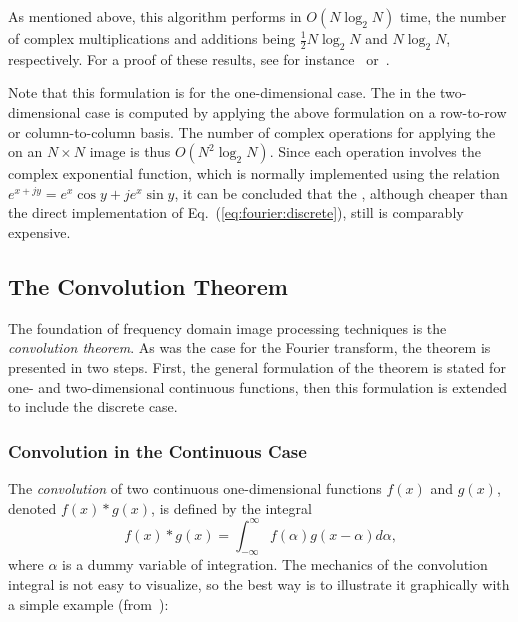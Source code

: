 As mentioned above, this algorithm performs in $O(N\log_{2}N)$ time,
the number of complex multiplications and additions being
$\frac{1}{2}N\log_{2}N$ and $N\log_{2}N$, respectively.  For a proof
of these results, see for instance~\cite{brigham} or~\cite{digim}.  

Note that this formulation is for the one-dimensional case.  The
{\fft} in the two-dimensional case is computed by applying the above
formulation on a row-to-row or column-to-column basis.
\label{pg:fft:O} The number of complex operations for applying the
{\fft} on an $N\times N$ image is thus $O(N^{2}\log_{2}N)$.  Since
each operation involves the complex exponential function, which is
normally implemented using the relation $e^{x+jy}=e^{x}\cos
y+je^{x}\sin y$, it can be concluded that the {\fft}, although
cheaper than the direct implementation of
Eq.~(\ref{eq:fourier:discrete}), still is comparably expensive.


\subsection{The Convolution Theorem}
\label{image:frequency:convolution}

The foundation of frequency domain image processing techniques is the
{\em convolution theorem\/}.  As was the case for the Fourier
transform, the theorem is presented in two steps.  First, the general
formulation of the theorem is stated for one- and two-dimensional
continuous functions, then this formulation is extended to include the
discrete case.

\subsubsection{Convolution in the Continuous Case}

The {\em convolution\/} of two continuous one-dimensional functions
$f(x)$ and $g(x)$, denoted $f(x)\ast g(x)$, is defined by the integral
\begin{equation}
\label{eq:convolution:def}
  f(x)\ast g(x)=\int_{-\infty}^{\infty}f(\alpha)g(x-\alpha)d\alpha\mbox{,}
\end{equation}
where $\alpha$ is a dummy variable of integration.  The mechanics of
the convolution integral is not easy to visualize, so the best way is
to illustrate it graphically with a simple example
(from~\cite{digim}):

